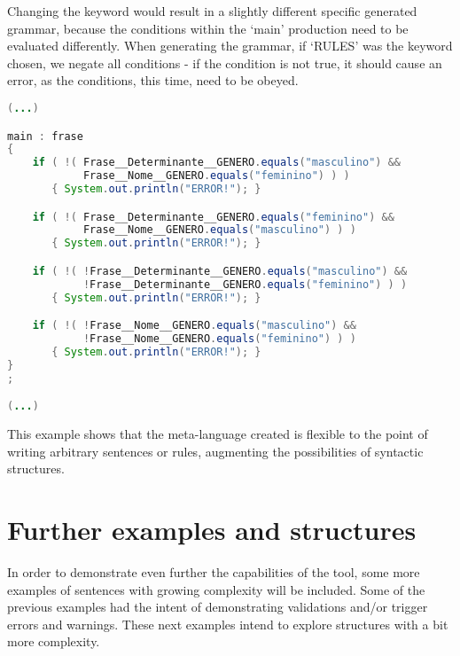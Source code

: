 Changing the keyword would result in a slightly different specific generated grammar, because the conditions within the ‘main’ production need to be evaluated differently.
When generating the grammar, if `RULES' was the keyword chosen, we negate all conditions - if the condition is not true, it should cause an error, as the conditions,
this time, need to be obeyed.

\begin{center}
\begin{minipage}{14cm}
\begin{lstlisting}[language=java, basicstyle=\small, label={lst:different_conditions_rules}, caption=Different conditions from RULES block]
(...)

main : frase
{
    if ( !( Frase__Determinante__GENERO.equals("masculino") &&
            Frase__Nome__GENERO.equals("feminino") ) )
       { System.out.println("ERROR!"); }

    if ( !( Frase__Determinante__GENERO.equals("feminino") &&
            Frase__Nome__GENERO.equals("masculino") ) )
       { System.out.println("ERROR!"); }

    if ( !( !Frase__Determinante__GENERO.equals("masculino") &&
            !Frase__Determinante__GENERO.equals("feminino") ) )
       { System.out.println("ERROR!"); }

    if ( !( !Frase__Nome__GENERO.equals("masculino") &&
            !Frase__Nome__GENERO.equals("feminino") ) )
       { System.out.println("ERROR!"); }
}
;

(...)
\end{lstlisting}
\end{minipage}
\end{center}


This example shows that the meta-language created is flexible to the point of writing arbitrary sentences or rules, 
augmenting the possibilities of syntactic structures.

\section{Further examples and structures}

In order to demonstrate even further the capabilities of the tool, some more examples of sentences with growing complexity will be included.
Some of the previous examples had the intent of demonstrating validations and/or trigger errors and warnings.
These next examples intend to explore structures with a bit more complexity.

